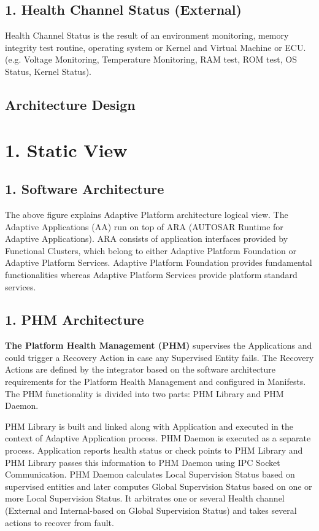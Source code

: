 \subsection*{1. Health Channel Status (External)}

Health Channel Status is the result of an environment monitoring, memory integrity test routine, operating system or Kernel and Virtual Machine or E\+CU. (e.\+g. Voltage Monitoring, Temperature Monitoring, R\+AM test, R\+OM test, OS Status, Kernel Status). \hypertarget{Architecture_Design}{}\subsection{Architecture Design}\label{Architecture_Design}
\section*{1. Static View}

\subsection*{1. Software Architecture}

 The above figure explains Adaptive Platform architecture logical view. The Adaptive Applications (AA) run on top of A\+RA (A\+U\+T\+O\+S\+AR Runtime for Adaptive Applications). A\+RA consists of application interfaces provided by Functional Clusters, which belong to either Adaptive Platform Foundation or Adaptive Platform Services. Adaptive Platform Foundation provides fundamental functionalities whereas Adaptive Platform Services provide platform standard services.

\subsection*{1. P\+HM Architecture}


\begin{DoxyItemize}
\item {\bfseries The Platform Health Management (P\+HM)} supervises the Applications and could trigger a Recovery Action in case any Supervised Entity fails. The Recovery Actions are defined by the integrator based on the software architecture requirements for the Platform Health Management and configured in Manifests. The P\+HM functionality is divided into two parts\+: P\+HM Library and P\+HM Daemon.

P\+HM Library is built and linked along with Application and executed in the context of Adaptive Application process. P\+HM Daemon is executed as a separate process. Application reports health status or check points to P\+HM Library and P\+HM Library passes this information to P\+HM Daemon using I\+PC Socket Communication. P\+HM Daemon calculates Local Supervision Status based on supervised entities and later computes Global Supervision Status based on one or more Local Supervision Status. It arbitrates one or several Health channel (External and Internal-\/based on Global Supervision Status) and takes several actions to recover from fault.
\end{DoxyItemize}

